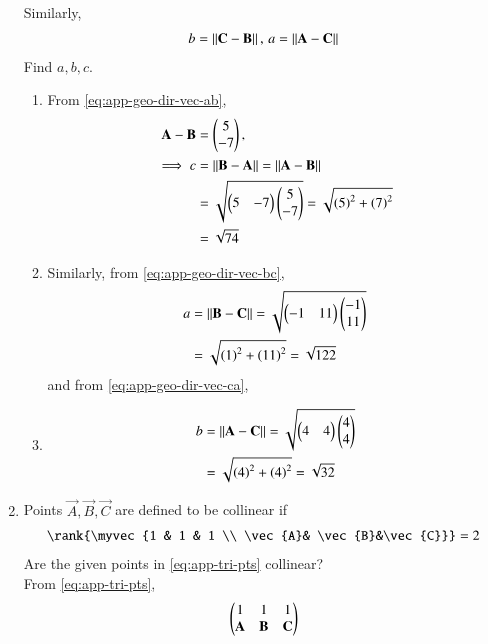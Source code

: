 \begin{enumerate}[label=\thesubsection.\arabic*.,ref=\thesubsection.\theenumi]
		Similarly, 
		\begin{align}
b = \left\lVert\mathbf{C}-\mathbf{B}\right\rVert,\,
a = \left\lVert\mathbf{A}-\mathbf{C}\right\rVert
		\end{align}
		Find $a, b, c$.
\begin{enumerate}
	\item 
	From 	
		\eqref{eq:app-geo-dir-vec-ab},
\begin{align}
\mathbf{A}-\mathbf{B} &= \begin{pmatrix}5\\-7\end{pmatrix}, \\
\implies 	c &= 	\left\lVert\mathbf{B}-\mathbf{A}\right\rVert = \left\lVert\mathbf{A}-\mathbf{B}\right\rVert 
	\\
	&= \sqrt{\begin{pmatrix}5 & -7\end{pmatrix}\begin{pmatrix}5\\-7\end{pmatrix}}
= \sqrt{\left(5\right)^2 +\left(7\right)^2}\\
	&=\sqrt{74}
		\label{eq:app-geo-norm-ab}
\end{align}
	\item Similarly, from 
		\eqref{eq:app-geo-dir-vec-bc},
\begin{align}
	a &= \left\lVert\mathbf{B}-\mathbf{C}\right\rVert 
	= \sqrt{\begin{pmatrix}-1 & 11\end{pmatrix}\begin{pmatrix}-1\\11\end{pmatrix}}
\\
&= \sqrt{\left(1\right)^2+\left(11\right)^2}
	= \sqrt{122}
		\label{eq:app-geo-norm-bc}
\end{align}
and
		from 		\eqref{eq:app-geo-dir-vec-ca},
	\item 
		\begin{align}
			b &= \left\lVert\mathbf{A}-\mathbf{C}\right\rVert = \sqrt{\begin{pmatrix}4 & 4\end{pmatrix}\begin{pmatrix}4\\4\end{pmatrix}}
\\
&= \sqrt{\left(4\right)^2+\left(4\right)^2}
	=\sqrt{32}
		\label{eq:app-geo-norm-ca}
\end{align}
\end{enumerate}
\item   Points $\vec{A}, \vec{B}, \vec{C}$ are defined to be collinear if 
		\begin{align}
			\label{eq:app-app-line-rank}
			\rank{\myvec{1 & 1 & 1 \\ \vec{A}& \vec{B}&\vec{C}}} = 2
		\end{align}
Are the given points in
			\eqref{eq:app-tri-pts}
collinear?
\\
\solution 
From 
			\eqref{eq:app-tri-pts},
\begin{align}
    \label{eq:app-1.1.3,2}
\begin{pmatrix}
    1 & 1 & 1\\
    \mathbf{A} & \mathbf{B} & \mathbf{C} \\
\end{pmatrix}
\end{align}
\end{enumerate}
